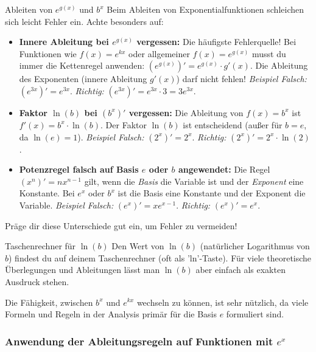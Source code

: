 \begin{fehlerboxumgebung}{Ableiten von $e^{g(x)}$ und $b^x$}
Beim Ableiten von Exponentialfunktionen schleichen sich leicht Fehler ein. Achte besonders auf:
\begin{itemize}
    \item \textbf{Innere Ableitung bei $e^{g(x)}$ vergessen:} Die häufigste Fehlerquelle! Bei Funktionen wie $f(x) = e^{kx}$ oder allgemeiner $f(x) = e^{g(x)}$ musst du immer die Kettenregel anwenden: $(e^{g(x)})' = e^{g(x)} \cdot g'(x)$. Die Ableitung des Exponenten (innere Ableitung $g'(x)$) darf nicht fehlen!
    \textit{Beispiel Falsch:} $(e^{3x})' = e^{3x}$. \textit{Richtig:} $(e^{3x})' = e^{3x} \cdot 3 = 3e^{3x}$.
    \item \textbf{Faktor $\ln(b)$ bei $(b^x)'$ vergessen:} Die Ableitung von $f(x)=b^x$ ist $f'(x) = b^x \cdot \ln(b)$. Der Faktor $\ln(b)$ ist entscheidend (außer für $b=e$, da $\ln(e)=1$).
    \textit{Beispiel Falsch:} $(2^x)' = 2^x$. \textit{Richtig:} $(2^x)' = 2^x \cdot \ln(2)$.
    \item \textbf{Potenzregel falsch auf Basis $e$ oder $b$ angewendet:} Die Regel $(x^n)' = nx^{n-1}$ gilt, wenn die \textit{Basis} die Variable ist und der \textit{Exponent} eine Konstante. Bei $e^x$ oder $b^x$ ist die Basis eine Konstante und der Exponent die Variable.
    \textit{Beispiel Falsch:} $(e^x)' = xe^{x-1}$. \textit{Richtig:} $(e^x)' = e^x$.
\end{itemize}
Präge dir diese Unterschiede gut ein, um Fehler zu vermeiden!
\end{fehlerboxumgebung}

\begin{tippumgebung}{Taschenrechner für $\ln(b)$}
Den Wert von $\ln(b)$ (natürlicher Logarithmus von $b$) findest du auf deinem Taschenrechner (oft als 'ln'-Taste). Für viele theoretische Überlegungen und Ableitungen lässt man $\ln(b)$ aber einfach als exakten Ausdruck stehen.
\end{tippumgebung}


Die Fähigkeit, zwischen $b^x$ und $e^{kx}$ wechseln zu können, ist sehr nützlich, da viele Formeln und Regeln in der Analysis primär für die Basis $e$ formuliert sind.

\subsubsection{Anwendung der Ableitungsregeln auf Funktionen mit $e^x$}
\label{subsubsec:ableitungsregeln_ex}


